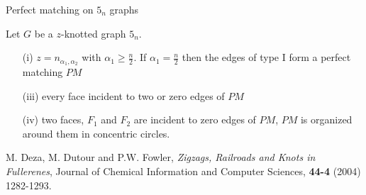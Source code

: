 \documentclass[%
pdf,
colorBG,
slideColor,
]{prosper}
\begin{document}
\begin{slide}{Perfect matching on $5_n$ graphs}
\begin{center}
\begin{minipage}{57mm}
{\scriptsize
Let $G$ be a $z$-knotted graph $5_n$. 
\begin{enumerate}
\item[(i)] $z=n_{\alpha_1, \alpha_2}$ with $\alpha_1\geq \frac{n}{2}$. If $\alpha_1=\frac{n}{2}$ then the edges of type I form a perfect matching $PM$
\item[(iii)] every face incident to two or zero edges of $PM$
\item[(iv)] two faces, $F_1$ and $F_2$ are incident to zero edges of $PM$, $PM$ is organized around them in concentric circles.
\end{enumerate}
}
\end{minipage}
\begin{minipage}{5.5cm}
\epsfxsize=55mm
\end{minipage}



\end{center}

{\scriptsize

M. Deza, M. Dutour and P.W. Fowler, {\em Zigzags, Railroads and Knots in Fullerenes}, Journal of Chemical Information and Computer Sciences, {\bf 44-4} (2004) 1282-1293.
}

\end{slide}






%
\end{document}
